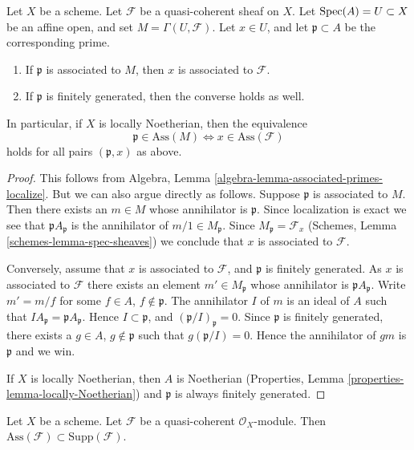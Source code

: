 \begin{lemma}
\label{lemma-associated-affine-open}
Let $X$ be a scheme. Let $\mathcal{F}$ be a quasi-coherent sheaf on $X$.
Let $\mathop{\mathrm{Spec}}(A) = U \subset X$ be an affine open, and set
$M = \Gamma(U, \mathcal{F})$.
Let $x \in U$, and let $\mathfrak p \subset A$ be the corresponding prime.
\begin{enumerate}
\item If $\mathfrak p$ is associated to $M$, then $x$ is associated
to $\mathcal{F}$.
\item If $\mathfrak p$ is finitely generated, then the converse holds
as well.
\end{enumerate}
In particular, if $X$ is locally Noetherian, then the equivalence
$$
\mathfrak p \in \text{Ass}(M) \Leftrightarrow x \in \text{Ass}(\mathcal{F})
$$
holds for all pairs $(\mathfrak p, x)$ as above.
\end{lemma}

\begin{proof}
This follows from
Algebra, Lemma \ref{algebra-lemma-associated-primes-localize}.
But we can also argue directly as follows.
Suppose $\mathfrak p$ is associated to $M$.
Then there exists an $m \in M$ whose annihilator is $\mathfrak p$.
Since localization is exact we see that
$\mathfrak pA_{\mathfrak p}$ is the annihilator of
$m/1 \in M_{\mathfrak p}$. Since $M_{\mathfrak p} = \mathcal{F}_x$
(Schemes, Lemma \ref{schemes-lemma-spec-sheaves})
we conclude that $x$ is associated to $\mathcal{F}$.

\medskip\noindent
Conversely, assume that $x$ is associated to $\mathcal{F}$,
and $\mathfrak p$ is finitely generated.
As $x$ is associated to $\mathcal{F}$
there exists an element $m' \in M_{\mathfrak p}$ whose
annihilator is $\mathfrak pA_{\mathfrak p}$. Write
$m' = m/f$ for some $f \in A$, $f \not \in \mathfrak p$.
The annihilator $I$ of $m$ is an ideal of $A$ such that
$IA_{\mathfrak p} = \mathfrak pA_{\mathfrak p}$. Hence
$I \subset \mathfrak p$, and $(\mathfrak p/I)_{\mathfrak p} = 0$.
Since $\mathfrak p$ is finitely generated,
there exists a $g \in A$, $g \not \in \mathfrak p$ such that
$g(\mathfrak p/I) = 0$. Hence the annihilator of $gm$ is
$\mathfrak p$ and we win.

\medskip\noindent
If $X$ is locally Noetherian, then $A$ is Noetherian
(Properties, Lemma \ref{properties-lemma-locally-Noetherian})
and $\mathfrak p$ is always finitely generated.
\end{proof}

\begin{lemma}
\label{lemma-ass-support}
Let $X$ be a scheme.
Let $\mathcal{F}$ be a quasi-coherent $\mathcal{O}_X$-module.
Then $\text{Ass}(\mathcal{F}) \subset \text{Supp}(\mathcal{F})$.
\end{lemma}

